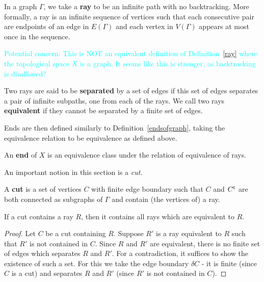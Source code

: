 In a graph \(\Gamma\), we take a \textbf{ray} to be an infinite path with no backtracking. More formally, a ray is an infinite sequence of vertices such that each consecutive pair are endpoints of an edge in \(E(\Gamma)\) and each vertex in \(V(\Gamma)\) appears at most once in the sequence.

\begin{remark}
\textcolor{cyan}{Potential concern: This is NOT an equivalent definition of Definition~\ref{ray} where the topological space \(X\) is a graph. It seems like this is stronger, as backtracking is disallowed?}
\end{remark}

\begin{definition}
Two rays are said to be \textbf{separated} by a set of edges if this set of edges separates a pair of infinite subpaths, one from each of the rays. We call two rays \textbf{equivalent} if they cannot be separated by a finite set of edges.
\end{definition}

Ends are then defined similarly to Definition~\ref{endsofgraph}, taking the equivalence relation to be equivalence as defined above. %

\begin{definition}
    An \textbf{end} of \(X\) is an equivalence class under the relation of equivalence of rays.  
\end{definition}

An important notion in this section is a \emph{cut}.
\begin{definition}[Cut]
 A \textbf{cut} is a set of vertices \(C\) with finite edge boundary such that \(C\) and \({C}^{\mathsf{c}}\) are both connected as subgraphs of \(\Gamma\) and contain (the vertices of) a ray.
\end{definition}

\begin{proposition}
    \label{prop:ray}
     If a cut contains a ray \(R\), then it contains all rays which are equivalent to \(R\).
\end{proposition}

\begin{proof}
    Let \(C\) be a cut containing \(R\). Suppose \(R'\) is a ray equivalent to \(R\) such that \(R'\) is not contained in \(C\).
    Since \(R\) and \(R'\) are equivalent, there is no finite set of edges which separates \(R\) and \(R'\). For a contradiction, it suffices to show the existence of such a set. For this we take the edge boundary \(\delta C\) - it is finite (since \(C\) is a cut) and separates \(R\) and \(R'\) (since \(R'\) is not contained in \(C\)). 
\end{proof}

